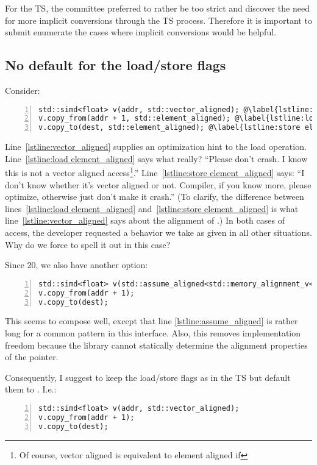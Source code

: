 For the TS, the committee preferred to rather be too strict and discover the need for more implicit conversions through the TS process.
Therefore it is important to submit enumerate the cases where implicit conversions would be helpful.

\subsection{No default for the load/store flags} \ghfeedback
Consider:
\medskip\begin{lstlisting}[style=Vc,numbers=left]
std::simd<float> v(addr, std::vector_aligned); @\label{lstline:vector_aligned}@
v.copy_from(addr + 1, std::element_aligned); @\label{lstline:load element_aligned}@
v.copy_to(dest, std::element_aligned); @\label{lstline:store element_aligned}@
\end{lstlisting}
Line~\ref{lstline:vector_aligned} supplies an optimization hint to the load operation.
Line~\ref{lstline:load element_aligned} says what really?
“Please don't crash.
I know this is not a vector aligned access\footnote{Of course, vector aligned is equivalent to element aligned if }.”
Line~\ref{lstline:store element_aligned} says:
“I don't know whether it's vector aligned or not.
Compiler, if you know more, please optimize, otherwise just don't make it crash.”
(To clarify, the difference between lines~\ref{lstline:load element_aligned} and~\ref{lstline:store element_aligned} is what line~\ref{lstline:vector_aligned} says about the alignment of .)
In both cases of  access, the developer requested a behavior we take as given in all other situations.
Why do we force to spell it out in this case?

Since \CC{}20, we also have another option:
\medskip\begin{lstlisting}[numbers=left]
std::simd<float> v(std::assume_aligned<std::memory_alignment_v<std::simd<float>>>(addr)); @\label{lstline:assume_aligned}@
v.copy_from(addr + 1);
v.copy_to(dest);
\end{lstlisting}
This seems to compose well, except that line \ref{lstline:assume_aligned} is rather long for a common pattern in this interface.
Also, this removes implementation freedom because the library cannot statically determine the alignment properties of the pointer.

Consequently, I suggest to keep the load/store flags as in the TS but default them to .
I.e.:
\medskip\begin{lstlisting}[numbers=left]
std::simd<float> v(addr, std::vector_aligned);
v.copy_from(addr + 1);
v.copy_to(dest);
\end{lstlisting}

